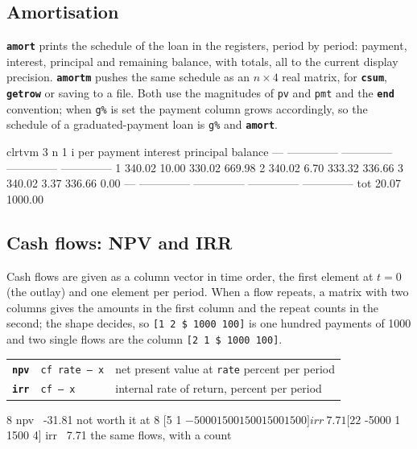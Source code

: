 \documentclass[11pt,letterpaper]{article}
\newcommand{\code}[1]{\texttt{#1}}
\newcommand{\cmd}[1]{\texttt{\textbf{#1}}}
\newcommand{\stk}[1]{\texttt{#1}}
\begin{document}
\subsection{Amortisation}

\cmd{amort} prints the schedule of the loan in the registers, period by period: payment, interest, principal and remaining balance, with totals, all to the current display precision. \cmd{amortm} pushes the same schedule as an $n\times 4$ real matrix, for \cmd{csum}, \cmd{getrow} or saving to a file. Both use the magnitudes of \code{pv} and \code{pmt} and the \cmd{end} convention; when \code{g\%} is set the payment column grows accordingly, so the schedule of a graduated-payment loan is \code{g\%} and \cmd{amort}.
\begin{rpn}
clrtvm 3 n 1 i%
  per        payment       interest      principal        balance
  --- -------------- -------------- -------------- --------------
    1         340.02          10.00         330.02         669.98
    2         340.02           6.70         333.32         336.66
    3         340.02           3.37         336.66           0.00
  --- -------------- -------------- -------------- --------------
  tot                         20.07        1000.00
\end{rpn}

\subsection{Cash flows: NPV and IRR}
\label{sec:cashflows}

Cash flows are given as a column vector in time order, the first element at $t=0$ (the outlay) and one element per period. When a flow repeats, a matrix with two columns gives the amounts in the first column and the repeat counts in the second; the shape decides, so \code{[1 2 \$ 1000 100]} is one hundred payments of 1000 and two single flows are the column \code{[2 1 \$ 1000 100]}.
\begin{center}
\begin{tabular}{@{}llp{}@{}}
\toprule
\cmd{npv} & \stk{cf rate -- x} & net present value at \code{rate} percent per period \\
\cmd{irr} & \stk{cf -- x} & internal rate of return, percent per period \\
\bottomrule
\end{tabular}
\end{center}
\begin{rpn}
[5 1 $ -5000 1500 1500 1500 1500] 8 npv     \ -31.81    not worth it at 8%
[5 1 $ -5000 1500 1500 1500 1500] irr       \ 7.71
[2 2 $ -5000 1 1500 4] irr                  \ 7.71      the same flows, with a count
\end{rpn}
\end{document}
